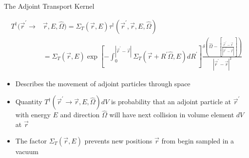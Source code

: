 \documentclass{beamer}
\begin{document}
\begin{frame}{The Adjoint Transport Kernel}

  \begin{align}
    T^{\dagger}(\vec{r}^{'} \to &\vec{r},E,\hat{\Omega}) = 
    \Sigma_T(\vec{r},E) \tau^{\dagger}(\vec{r}^{'},\vec{r},E,\hat{\Omega})
    \nonumber \\
    & = \Sigma_T(\vec{r},E) \exp{\left[-\int_0^{|\vec{r}^{'} - \vec{r}|} 
        \Sigma_T(\vec{r}+R^{'}\hat{\Omega},E)dR^{'} \right]} %
    \frac{\delta \left(\hat{\Omega} - \left[\frac{\vec{r}^{'} - \vec{r}}
        {|\vec{r}^{'} - \vec{r}|}\right]\right)}
         {|\vec{r}^{'} - \vec{r}|^2} \nonumber
  \end{align}

  \begin{itemize}
    \item Describes the movement of adjoint particles through space
      \medskip
    \item Quantity $T^{\dagger}(\vec{r}^{'} \to \vec{r},E,\hat{\Omega})dV$ is 
      probability that an adjoint particle at $\vec{r}^{'}$ with energy $E$ and 
      direction $\hat{\Omega}$ will have next collision in volume element $dV$ 
      at $\vec{r}$
      \medskip
    \item The factor $\Sigma_T(\vec{r},E)$ prevents new positions $\vec{r}$ 
      from begin sampled in a vacuum
  \end{itemize}

\end{frame}
\end{document}
